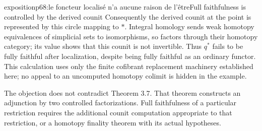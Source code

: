 \begin{dcomment}{exposition}{p68:le foncteur localisé n'a aucune raison de l'être}{Full faithfulness is controlled by the derived counit}
Consequently the derived counit at the point is represented by this circle mapping to $*$. Integral homology sends weak homotopy equivalences of simplicial sets to isomorphisms, so factors through their homotopy category; its value shows that this counit is not invertible. Thus $q^*$ fails to be fully faithful after localization, despite being fully faithful as an ordinary functor. This calculation uses only the finite cofibrant replacement machinery established here; no appeal to an uncomputed homotopy colimit is hidden in the example.

The objection does not contradict Theorem 3.7. That theorem constructs an adjunction by two controlled factorizations. Full faithfulness of a particular restriction requires the additional counit computation appropriate to that restriction, or a homotopy finality theorem with its actual hypotheses.
\end{dcomment}

